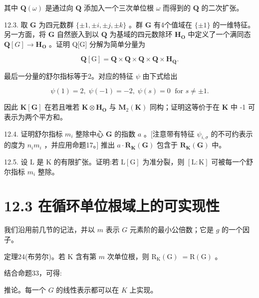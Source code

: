 \documentclass[10pt]{article}
\begin{document}
其中 \(\mathbf{Q}\left( \omega \right)\) 是通过向 \(\mathbf{Q}\) 添加入一个三次单位根 \(\omega\) 而得到的 \(\mathbf{Q}\) 的二次扩张。

12.3. 取 \(\mathbf{G}\) 为四元数群 \(\{  \pm  1, \pm  i, \pm  j, \pm  k\}\) 。群 \(\mathbf{G}\) 有4个值域在 \(\{  \pm  1\}\) 的一维特征。另一方面，将 \(\mathbf{G}\) 自然嵌入到以 \(\mathbf{Q}\) 为基域的四元数除环 \({\mathbf{H}}_{\mathbf{O}}\) 中定义了一个满同态 \(\mathbf{Q}\left\lbrack  G\right\rbrack   \rightarrow  {\mathbf{H}}_{\mathbf{O}}\) 。证明 Q[G] 分解为简单分量为

\[
\mathbf{Q}\left\lbrack  \mathrm{G}\right\rbrack   = \mathbf{Q} \times  \mathbf{Q} \times  \mathbf{Q} \times  \mathbf{Q} \times  {\mathbf{H}}_{\mathbf{Q}}.
\]

最后一分量的舒尔指标等于2。对应的特征 \(\psi\) 由下式给出

\[
\psi \left( 1\right)  = 2,\;\psi \left( {-1}\right)  =  - 2,\;\psi \left( s\right)  = 0\;\text{ for }s \neq   \pm  1.
\]

因此 \(\mathbf{K}\left\lbrack  \mathbf{G}\right\rbrack\) 在若且唯若 \(\mathbf{K} \otimes  {\mathbf{H}}_{\mathbf{O}}\) 与 \({\mathbf{M}}_{2}\left( \mathbf{K}\right)\) 同构；证明这等价于在 \(\mathbf{K}\) 中 -1 可表示为两个平方和。

12.4. 证明舒尔指标 \({m}_{i}\) 整除中心 \(\mathbf{G}\) 的指数 \(a\) 。[注意带有特征 \({\psi }_{i,\sigma }\) 的不可约表示的度为 \({n}_{i}{m}_{i}\) ，并应用命题17。] 推出 \(a \cdot  {\overline{\mathbf{R}}}_{\mathbf{K}}\left( \mathbf{G}\right)\) 包含于 \({\mathbf{R}}_{\mathbf{K}}\left( \mathbf{G}\right)\) 中。

12.5. 设 \(\mathrm{L}\) 是 \(\mathrm{K}\) 的有限扩张。证明:若 \(\mathrm{L}\left\lbrack  \mathrm{G}\right\rbrack\) 为准分裂，则 \(\left\lbrack  {\mathrm{L} : \mathrm{K}}\right\rbrack\) 可被每一个舒尔指标 \({m}_{i}\) 整除。

\section*{12.3 在循环单位根域上的可实现性}

我们沿用前几节的记法，并以 \(m\) 表示 \(G\) 元素阶的最小公倍数；它是 \(g\) 的一个因子。

定理24(布劳尔)。若 \(\mathrm{K}\) 含有第 \(m\) 次单位根，则 \({\mathrm{R}}_{\mathrm{K}}\left( \mathrm{G}\right) \; = \mathrm{R}\left( \mathrm{G}\right)\) 。

结合命题33，可得:

推论。每一个 \(G\) 的线性表示都可以在 \(K\) 上实现。
\end{document}

